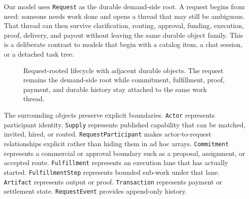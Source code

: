 Our model uses \texttt{Request} as the durable demand-side root. A request begins from need: someone needs work done and opens a thread that may still be ambiguous. That thread can then survive clarification, routing, approval, funding, execution, proof, delivery, and payout without leaving the same durable object family. This is a deliberate contrast to models that begin with a catalog item, a chat session, or a detached task tree.

\begin{figure}[t]
\centering
{}
\caption{Request-rooted lifecycle with adjacent durable objects. The request remains the demand-side root while commitment, fulfillment, proof, payment, and durable history stay attached to the same work thread.}
\label{fig:lifecycle}
\end{figure}

The surrounding objects preserve explicit boundaries. \texttt{Actor} represents participant identity. \texttt{Supply} represents published capability that can be matched, invited, hired, or routed. \texttt{RequestParticipant} makes actor-to-request relationships explicit rather than hiding them in ad hoc arrays. \texttt{Commitment} represents a commercial or approval boundary such as a proposal, assignment, or accepted route. \texttt{Fulfillment} represents an execution lane that has actually started. \texttt{FulfillmentStep} represents bounded sub-work under that lane. \texttt{Artifact} represents output or proof. \texttt{Transaction} represents payment or settlement state. \texttt{RequestEvent} provides append-only history.

